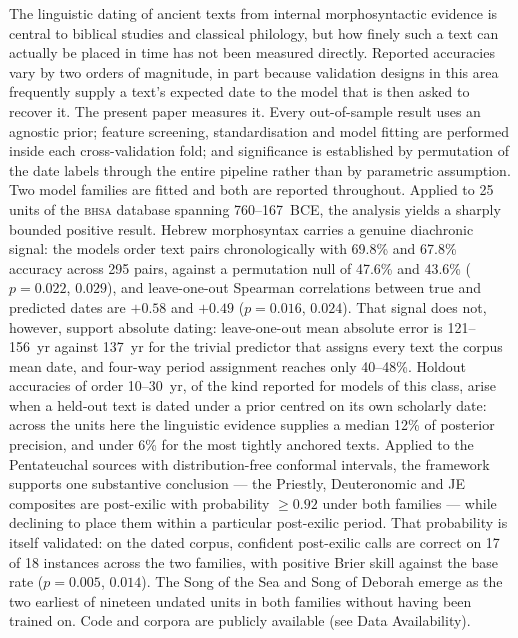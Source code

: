 \documentclass[10pt,letterpaper]{article}
\newcommand{\bhsa}{\textsc{bhsa}}
\begin{document}
The linguistic dating of ancient texts from internal morphosyntactic
evidence is central to biblical studies and classical philology, but how
finely such a text can actually be placed in time has not been measured
directly.  Reported accuracies vary by two orders of magnitude,
in part because validation designs in this area frequently supply a text's
expected date to the model that is then asked to recover it.  The present
paper measures it.  Every out-of-sample result uses an agnostic
prior; feature screening, standardisation and model fitting are performed
inside each cross-validation fold; and significance is established by
permutation of the date labels through the entire pipeline rather than by
parametric assumption.  Two model families are fitted and both are
reported throughout.  Applied to 25 units of the \bhsa{} database spanning
760--167~BCE, the analysis yields a sharply bounded positive result.
Hebrew morphosyntax carries a genuine diachronic signal: the models order
text pairs chronologically with 69.8\% and 67.8\% accuracy across 295
pairs, against a permutation null of 47.6\% and 43.6\% ($p = 0.022$,
$0.029$), and leave-one-out Spearman correlations between true and
predicted dates are $+0.58$ and $+0.49$ ($p = 0.016$, $0.024$).  That signal does not,
however, support absolute dating: leave-one-out mean absolute error is
121--156~yr against 137~yr for the trivial predictor that assigns every
text the corpus mean date, and four-way period assignment reaches only
40--48\%.  Holdout accuracies of order 10--30~yr, of the kind reported for models of
this class, arise when a held-out text is dated under a prior centred on
its own scholarly date: across the units here the linguistic evidence
supplies a median 12\% of posterior precision, and under 6\% for the most
tightly anchored texts.  Applied to the
Pentateuchal sources with distribution-free conformal intervals, the
framework supports one substantive conclusion --- the Priestly,
Deuteronomic and JE composites are post-exilic with probability
$\geq 0.92$ under both families --- while declining to place them within a
particular post-exilic period.  That probability is itself validated: on
the dated corpus, confident post-exilic calls are correct on 17 of 18
instances across the two families, with positive Brier skill against the
base rate ($p = 0.005$, $0.014$).  The Song of the Sea and Song of Deborah
emerge as the two earliest of nineteen undated units in both families
without having been trained on.  Code and corpora are publicly available
(see Data Availability).
\end{document}
